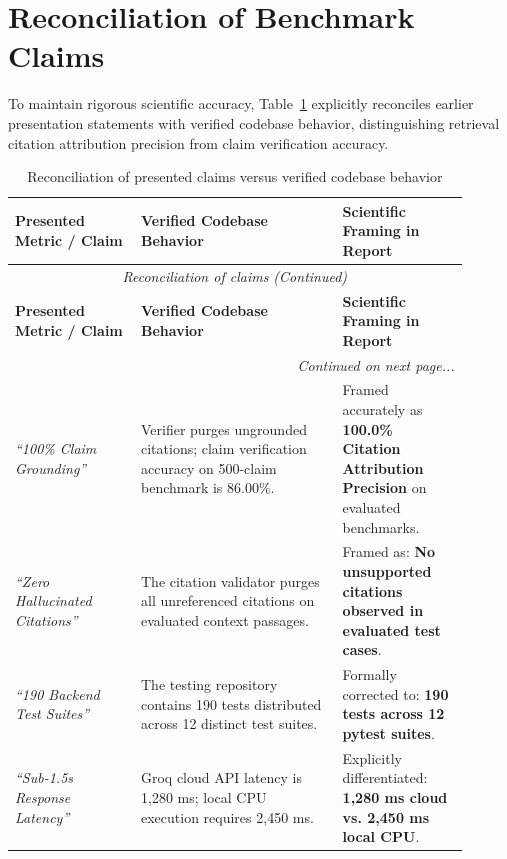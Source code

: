 \section{Reconciliation of Benchmark Claims}
\label{sec:claim_reconciliation}

To maintain rigorous scientific accuracy, Table~\ref{tab:9_3_reconciliation} explicitly reconciles earlier presentation statements with verified codebase behavior, distinguishing retrieval citation attribution precision from claim verification accuracy.

\small
\begin{longtable}{@{}p{0.25\linewidth} p{0.40\linewidth} p{0.25\linewidth}@{}}
\caption{Reconciliation of presented claims versus verified codebase behavior}\label{tab:9_3_reconciliation} \\
\toprule
\textbf{Presented Metric / Claim} & \textbf{Verified Codebase Behavior} & \textbf{Scientific Framing in Report} \\
\midrule
\endfirsthead
\toprule
\multicolumn{3}{c}{\small\textit{Reconciliation of claims (Continued)}} \\[4pt]
\midrule
\textbf{Presented Metric / Claim} & \textbf{Verified Codebase Behavior} & \textbf{Scientific Framing in Report} \\
\midrule
\endhead
\midrule
\multicolumn{3}{r}{\footnotesize\textit{Continued on next page...}} \\
\bottomrule
\endfoot
\bottomrule
\endlastfoot
\textit{``100\% Claim Grounding''} & Verifier purges ungrounded citations; claim verification accuracy on 500-claim benchmark is 86.00\%. & Framed accurately as \textbf{100.0\% Citation Attribution Precision} on evaluated benchmarks. \\
\textit{``Zero Hallucinated Citations''} & The citation validator purges all unreferenced citations on evaluated context passages. & Framed as: \textbf{No unsupported citations observed in evaluated test cases}. \\
\textit{``190 Backend Test Suites''} & The testing repository contains 190 tests distributed across 12 distinct test suites. & Formally corrected to: \textbf{190 tests across 12 pytest suites}. \\
\textit{``Sub-1.5s Response Latency''} & Groq cloud API latency is 1,280 ms; local CPU execution requires 2,450 ms. & Explicitly differentiated: \textbf{1,280 ms cloud vs. 2,450 ms local CPU}. \\
\bottomrule
\end{longtable}
\normalsize


